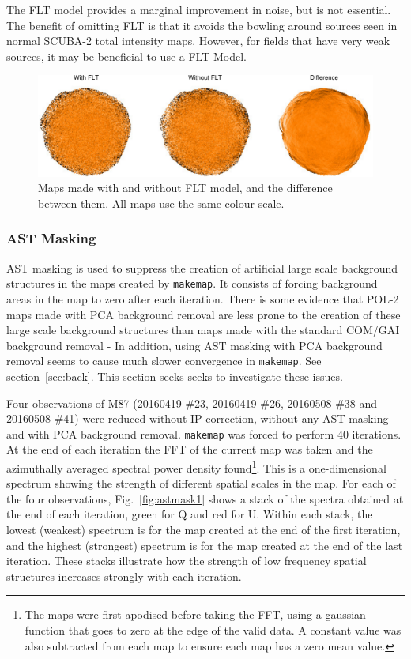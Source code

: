 \documentclass[twoside,11pt]{starlink}
\begin{document}
The FLT model provides a marginal improvement in noise, but is
not essential. The benefit of omitting FLT is that it avoids the bowling
around sources seen in normal SCUBA-2 total intensity maps. However, for
fields that have very weak sources, it may be beneficial to use a FLT Model.

\begin{figure}
\includegraphics[width=\columnwidth]{flt}
\caption{Maps made with and without FLT model, and the difference between
them. All maps use the same colour scale.}
\label{fig:flt}
\end{figure}


\subsubsection{AST Masking}
\label{sec:astmasking}
AST masking is used to suppress the creation of artificial large scale
background structures in the maps created by \texttt{makemap}. It
consists of forcing background areas in the map to zero after each
iteration. There is some evidence that POL-2 maps made with PCA background
removal are less prone to the creation of these  large scale background
structures than maps made with the standard COM/GAI background removal -
In addition, using AST masking with PCA background removal seems to cause
much slower convergence in \texttt{makemap}. See section~\ref{sec:back}. This
section seeks seeks to investigate these issues.

Four observations of M87 (20160419 \#23, 20160419 \#26, 20160508 \#38
and 20160508 \#41) were reduced without IP correction, without any AST
masking and with PCA background removal. \texttt{makemap} was forced to
perform 40 iterations. At the end of each iteration the FFT of the
current map was taken and the azimuthally averaged spectral power density
found\footnote{The maps were first apodised before taking the FFT, using a
gaussian function that goes to zero at the edge of the valid data. A
constant value was also subtracted from each map to ensure each map has a
zero mean value.}. This is a one-dimensional spectrum showing the strength of
different spatial scales in the map. For each of the four observations,
Fig.~\ref{fig:astmask1} shows a stack of the spectra obtained at the end
of each iteration, green for Q and red for U. Within each stack, the
lowest (weakest) spectrum is for the map created at the end of the first
iteration, and the highest (strongest) spectrum is for the map created at
the end of the last iteration. These stacks illustrate how the strength
of low frequency spatial structures increases strongly with each iteration.
\end{document}
